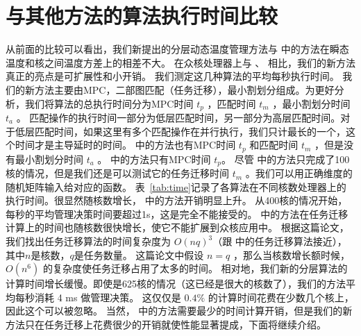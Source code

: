  \section{与其他方法的算法执行时间比较}\label{sec:time_comp}
 
 从前面的比较可以看出，我们新提出的分层动态温度管理方法与 \cite{MaWang:APCCAS'14}中的方法在瞬态温度和核之间温度方差上的相差不大。
 在众核处理器上与 \cite{MaWang:APCCAS'14}、 \cite{Hanumaiah:TCAD'11}相比，我们的新方法真正的亮点是可扩展性和小开销。
 我们测定这几种算法的平均每秒执行时间。
 我们的新方法主要由MPC，二部图匹配（任务迁移），最小割划分组成。为更好分析，我们将算法的总执行时间分为MPC时间 $t_p$ ，匹配时间 $t_m$ ，最小割划分时间 $t_a$ 。
 匹配操作的执行时间一部分为低层匹配时间，另一部分为高层匹配时间。对于低层匹配时间，如果这里有多个匹配操作在并行执行，我们只计最长的一个，这个时间才是主导延时的时间。
 \cite{MaWang:APCCAS'14} 中的方法也有MPC时间 $t_p$ 和匹配时间 $t_m$ ，但是没有最小割划分时间 $t_a$ 。
\cite{Zanini:ECCTD'09} 中的方法只有MPC时间 $t_p$。
 尽管 \cite{Hanumaiah:TCAD'11} 中的方法只完成了100核的情况，但是我们还是可以测试它的任务迁移时间 $t_m$ 。我们可以用正确维度的随机矩阵输入给对应的函数。
 表~\ref{tab:time}记录了各算法在不同核数处理器上的执行时间。很显然随核数增长， \cite{MaWang:APCCAS'14} 中的方法开销明显上升。
 从400核的情况开始，每秒的平均管理决策时间要超过1s，这是完全不能接受的。
 \cite{Hanumaiah:TCAD'11} 中的方法在任务迁移计算上的时间也随核数很快增长，使它不能扩展到众核应用中。
 根据这篇论文，我们找出任务迁移算法的时间复杂度为 $O(nq)^3$（跟 \cite{MaWang:APCCAS'14} 中的任务迁移算法接近），其中$n$是核数，$q$是任务数量。
 这篇论文中假设 $n=q$ ，那么当核数增长额时候， $O(n^6)$ 的复杂度使任务迁移占用了太多的时间。
 相对地，我们新的分层算法的计算时间增长缓慢。即使是625核的情况（这已经是很大的核数了），我们的方法平均每秒消耗 4 ms 做管理决策。
 这仅仅是 $0.4\%$ 的计算时间花费在少数几个核上，因此这个可以被忽略。
 当然，\cite{Zanini:ECCTD'09} 中的方法需要最少的时间计算开销，但是我们的新方法只在任务迁移上花费很少的开销就使性能显著提成，下面将继续介绍。
